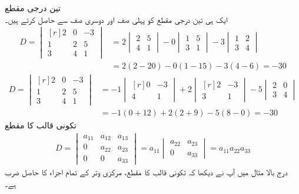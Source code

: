 \quad تین درجی مقطع\\
ایک ہی تین درجی مقطع کو پہلی صف اور دوسری صف سے حاصل کرتے ہیں۔
\begin{align*}
D=\begin{vmatrix*}[r] 2&0&-3\\1&2&5\\3&4&1 \end{vmatrix*}&=
2\begin{vmatrix} 2&5\\4&1 \end{vmatrix}-0\begin{vmatrix} 1&5\\3&1 \end{vmatrix}-3\begin{vmatrix} 1&2\\3&4 \end{vmatrix}\\
&=2(2-20)-0(1-15)-3(4-6)=-30
\end{align*}
%
\begin{align*}
D=\begin{vmatrix*}[r] 2&0&-3\\1&2&5\\3&4&1 \end{vmatrix*}&=
-1\begin{vmatrix*}[r] 0&-3\\4&1 \end{vmatrix*}+2\begin{vmatrix*}[r] 2&-3\\3&1 \end{vmatrix*}-5\begin{vmatrix} 2&0\\3&4 \end{vmatrix}\\
&=-1(0+12)+2(2+9)-5(8-0)=-30
\end{align*}
\quad تکونی قالب کا مقطع\\
\begin{align}
D=\begin{vmatrix} a_{11}&a_{12}&a_{13}\\0&a_{22}&a_{23}\\0&0&a_{33} \end{vmatrix}=a_{11}\begin{vmatrix} a_{22}&a_{23}\\0&a_{33} \end{vmatrix}=a_{11}a_{22}a_{33}
\end{align}
درج بالا مثال میں آپ نے دیکھا کہ تکونی قالب کا مقطع، مرکزی وتر کے تمام اجزاء کا حاصل ضرب ہے۔

